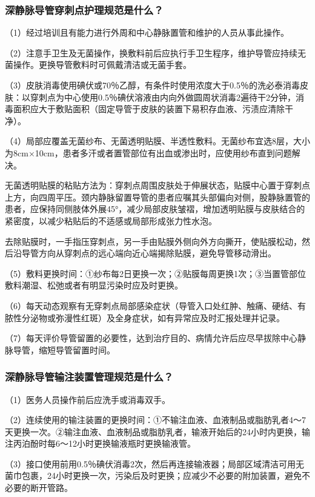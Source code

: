 \subsubsection{深静脉导管穿刺点护理规范是什么？}

（1）经过培训且有能力进行外周和中心静脉置管和维护的人员从事此操作。

（2）注意手卫生及无菌操作，换敷料前后应执行手卫生程序，维护导管应持续无菌操作。更换导管敷料时可佩戴清洁或无菌手套。

（3）皮肤消毒使用碘伏或70％乙醇，有条件时使用浓度大于0.5％的洗必泰消毒皮肤：以穿刺点为中心使用0.5％碘伏溶液由内向外做圆周状消毒2遍待干2分钟，消毒面积应大于敷贴面积（固定导管于皮肤的装置下易积存血液、污渍应清除干净）。

（4）局部应覆盖无菌纱布、无菌透明贴膜、半透性敷料。无菌纱布宜选8层，大小为8cm×10cm，患者多汗或者置管部位有出血或渗出时，应使用纱布直到问题解决。

无菌透明贴膜的粘贴方法为：穿刺点周围皮肤处于伸展状态，贴膜中心置于穿刺点上方，向四周平压。颈内静脉留置导管的患者应嘱其头部偏向对侧，股静脉置管的患者，应保持同侧肢体外展45°，减少局部皮肤皱褶，增加透明贴膜与皮肤结合的紧密度，以减少粘贴后的不适感或局部形成张力性水泡。

去除贴膜时，一手指压穿刺点，另一手由贴膜外侧向外方向撕开，使贴膜松动，然后沿导管方向从穿刺点的远心端向近心端揭除贴膜，避免导管移动滑出。

（5）敷料更换时间：①纱布每2日更换一次；②贴膜每周更换1次；③当置管部位敷料潮湿、松弛或者有明显污染时应及时更换。

（6）每天动态观察有无穿刺点局部感染症状（导管入口处红肿、触痛、硬结、有脓性分泌物或弥漫性红斑）及全身症状，如有异常应及时汇报处理并记录。

（7）每天评价导管留置的必要性，达到治疗目的、病情允许后应尽早拔除中心静脉导管，缩短导管留置时间。

\subsubsection{深静脉导管输注装置管理规范是什么？}

（1）医务人员操作前后应洗手或消毒双手。

（2）连续使用的输注装置的更换时间：①不输注血液、血液制品或脂肪乳者4～7天更换一次。②输注血液、血液制品或脂肪乳者，输液开始后的24小时内更换，输注丙泊酚时每6～12小时更换输液瓶时更换输液管。

（3）接口使用前用0.5％碘伏消毒2次，然后再连接输液器；局部区域清洁可用无菌巾包裹，24小时更换一次，污染后及时更换；应减少不必要的附加装置，避免不必要的断开管路。

